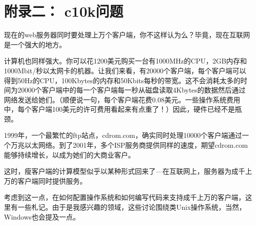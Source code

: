 \documentclass[twoside, xetex]{report}
\begin{document}
\chapter{附录二： c10k问题}
	现在的web服务器同时要处理上万个客户端，你不这样认为么？毕竟，现在互联网是一个强大的地方。
	
	计算机也同样强大。你可以花1200美元购买一台有1000MHz的CPU，2GB内存和1000Mbit/秒以太网卡的机器。让我们来看，有20000个客户端，每个客户端可以得到50Hz的CPU，100Kbytes的内存和50Kbits每秒的带宽。这不会消耗太多的时间为20000个客户端中的每一个客户端每一秒从磁盘读取4Kbytes的数据然后通过网络发送给她们。（顺便说一句，每个客户端花费0.08美元。一些操作系统费用中，每个客户端100美元的许可费用看起来有点重了！）因此，硬件已经不是瓶颈。
	
	1999年，一个最繁忙的ftp站点，cdrom.com，确实同时处理10000个客户端通过一个万兆以太网络。到了2001年，多个ISP服务商提供同样的速度，期望cdrom.com能够持续增长，以成为她们的大商业客户。
	
	这时，瘦客户端的计算模型似乎以某种形式回来了---在互联网上，服务器为成千上万的客户端同时提供服务。
	
	考虑到这一点，在如何配置操作系统和如何编写代码来支持成千上万的客户端，这里有一些札记。由于是我感兴趣的领域，这些讨论围绕类Unix操作系统，当然，Windows也会提及一点。	
\end{document}
